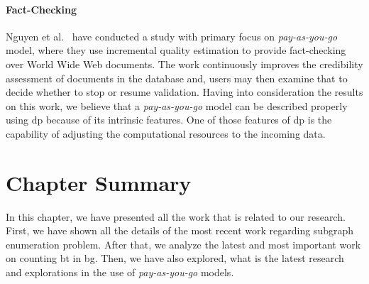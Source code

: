 \paragraph{Fact-Checking} Nguyen et al.~\cite{factcatch} have conducted a study with primary focus on \emph{pay-as-you-go} model, where they use incremental quality estimation to provide fact-checking over World Wide Web documents.
The work continuously improves the credibility assessment of documents in the database and, users may then examine that to decide whether to stop or resume validation.
Having into consideration the results on this work, we believe that a \emph{pay-as-you-go} model can be described properly using \acrlong{dp} because of its intrinsic features. 
One of those features of \acrshort{dp} is the capability of adjusting the computational resources to the incoming data. 

\section{Chapter Summary}
In this chapter, we have presented all the work that is related to our research.
First, we have shown all the details of the most recent work regarding subgraph enumeration problem. 
After that, we analyze the latest and most important work on counting \acrlong{bt} in \acrlong{bg}.
Then, we have also explored, what is the latest research and explorations in the use of \emph{pay-as-you-go} models.
